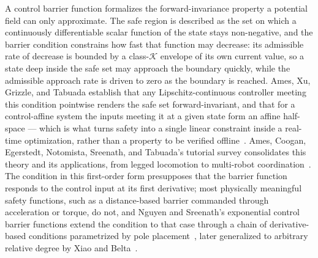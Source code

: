 \documentclass[12pt,a4paper,twoside,openright]{report}
\begin{document}
A control barrier function formalizes the forward-invariance property a potential field can only approximate. The safe region is described as the set on which a continuously differentiable scalar function of the state stays non-negative, and the barrier condition constrains how fast that function may decrease: its admissible rate of decrease is bounded by a class-$\mathcal{K}$ envelope of its own current value, so a state deep inside the safe set may approach the boundary quickly, while the admissible approach rate is driven to zero as the boundary is reached. Ames, Xu, Grizzle, and Tabuada establish that any Lipschitz-continuous controller meeting this condition pointwise renders the safe set forward-invariant, and that for a control-affine system the inputs meeting it at a given state form an affine half-space --- which is what turns safety into a single linear constraint inside a real-time optimization, rather than a property to be verified offline~\cite{ames2017cbf}. Ames, Coogan, Egerstedt, Notomista, Sreenath, and Tabuada's tutorial survey consolidates this theory and its applications, from legged locomotion to multi-robot coordination~\cite{ames2019ecc}. The condition in this first-order form presupposes that the barrier function responds to the control input at its first derivative; most physically meaningful safety functions, such as a distance-based barrier commanded through acceleration or torque, do not, and Nguyen and Sreenath's exponential control barrier functions extend the condition to that case through a chain of derivative-based conditions parametrized by pole placement~\cite{nguyen2016exponential}, later generalized to arbitrary relative degree by Xiao and Belta~\cite{xiao2022highorder}.
\end{document}
